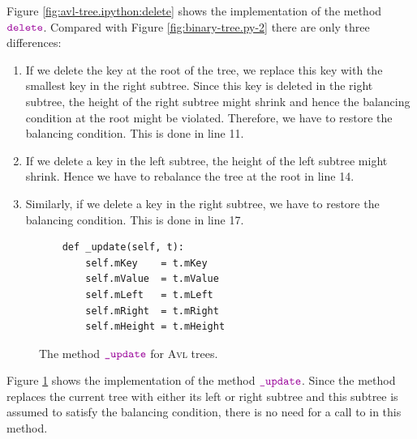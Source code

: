 Figure \ref{fig:avl-tree.ipython:delete} shows the implementation of the method $\mytt{delete}$.
Compared with Figure
\ref{fig:binary-tree.py-2} there are only three differences:
\begin{enumerate}
\item If we delete the key at the root of the tree, we replace this key with the smallest key in the
      right subtree. Since this key is deleted in the right subtree, the height of the right
      subtree might shrink and hence the balancing condition at the root might be violated.
      Therefore, we have to restore the balancing condition.  This is done in line 11.
\item If we delete a key in the left subtree, the height of the left subtree might shrink.
      Hence we have to rebalance the tree at the root in line 14.
\item Similarly, if we delete a key in the right subtree, we have to restore the balancing
      condition.  This is done in line 17.
\end{enumerate}
\FloatBarrier
\pagebreak

\begin{figure}[!ht]
\centering
\begin{verbatim}
    def _update(self, t):
        self.mKey    = t.mKey
        self.mValue  = t.mValue
        self.mLeft   = t.mLeft
        self.mRight  = t.mRight
        self.mHeight = t.mHeight            
\end{verbatim}
\vspace*{-0.3cm}
\caption{The method $\mytt{\_update}$ for \textsc{Avl} trees.}
\label{fig:avl-tree.ipython:update}
\end{figure}

Figure \ref{fig:avl-tree.ipython:update} shows the implementation of the method $\mytt{\_update}$.
Since the method  replaces the current tree with either its left or right subtree and this
subtree is assumed to satisfy the balancing condition, there is no need for a call to  in this
method. 
\FloatBarrier


